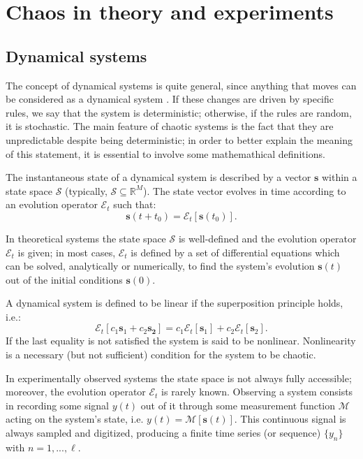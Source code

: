 \chapter{Chaos in theory and experiments}
\label{chap: chaos}

\section{Dynamical systems}
\label{sec: dynamical systems}

The concept of dynamical systems is quite general, since anything that moves can be considered as a
dynamical system \cite{ref:fractal_dim}. If these changes are driven
by specific rules, we say that the system is deterministic; otherwise, if the rules
are random, it is stochastic. The main feature of chaotic systems is the fact that they are unpredictable
despite being deterministic; in order to better explain the meaning of this statement, it is essential
to involve some mathemathical definitions.

The instantaneous state of a dynamical system is described by a vector $\mathbf{s}$ within a
state space $\mathcal{S}$ (typically, $\mathcal{S}\subseteq \mathbb{R}^M$).
The state vector evolves in time according to an evolution operator $\mathcal{E}_t$ such that:
\begin{equation}
\label{eq: state space evolution}
    \mathbf{s}(t+t_0)=\mathcal{E}_t[\mathbf{s}(t_0)].
\end{equation}

In theoretical systems the state space $\mathcal{S}$ is well-defined and the evolution operator
$\mathcal{E}_t$ is given; in most cases, $\mathcal{E}_t$ is defined by a set of differential equations
which can be solved, analytically or numerically, to find the system's evolution $\mathbf{s}(t)$
out of the initial conditions $\mathbf{s}(0)$.

A dynamical system is defined to be linear if the superposition principle holds, i.e.:
\begin{equation}
\label{eq: linear systems}
    \mathcal{E}_t[c_1\mathbf{s}_1+c_2\mathbf{s_2}]=c_1\mathcal{E}_t[\mathbf{s}_1]+
    c_2\mathcal{E}_t[\mathbf{s}_2].
\end{equation}
If the last equality is not satisfied the system is said to be nonlinear.
Nonlinearity is a necessary (but not sufficient) condition for the system to be chaotic.

In experimentally observed systems the state space is not always fully accessible; moreover,
the evolution operator $\mathcal{E}_t$ is rarely known.
Observing a system consists in recording some signal $y(t)$ out of it through some measurement
function $\mathcal{M}$ acting on the system's state, i.e. $y(t)=\mathcal{M}[\mathbf{s}(t)]$.
This continuous signal is always sampled and digitized, producing a finite time series (or sequence)
$\{y_n\}$ with $n=1,...,\ell$.



